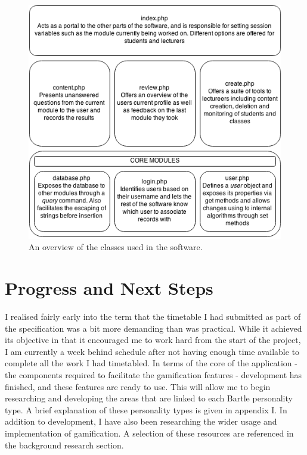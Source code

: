 \documentclass[10pt,a4paper]{report}
\begin{document}
\begin{figure}
	\includegraphics[width=\textwidth]{../img/classes.png}
	\caption{An overview of the classes used in the software.}
	\label{classes}
\end{figure}

\section*{Progress and Next Steps}
I realised fairly early into the term that the timetable I had submitted as part of the specification was a bit more demanding than was practical. While it achieved its objective in that it encouraged me to work hard from the start of the project, I am currently a week behind schedule after not having enough time available to complete all the work I had timetabled. In terms of the core of the application - the components required to facilitate the gamification features - development has finished, and these features are ready to use. This will allow me to begin researching and developing the areas that are linked to each Bartle personality type. A brief explanation of these personality types is given in appendix I. In addition to development, I have also been researching the wider usage and implementation of gamification. A selection of these resources are referenced in the background research section.
\end{document}
